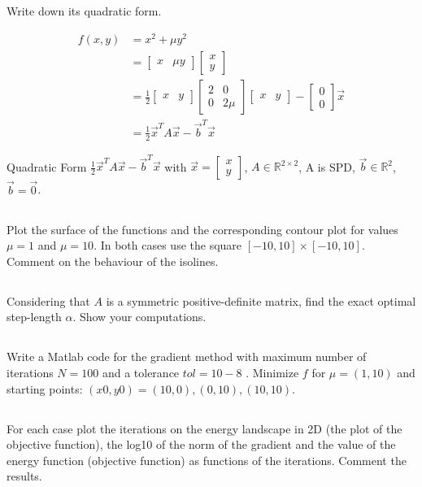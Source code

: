 \documentclass[unicode,11pt,a4paper,oneside,numbers=endperiod,openany]{scrartcl}
\newcommand{\myvec}[1]{\begin{bmatrix} #1 \end{bmatrix}}
\newcommand{\myex}[1]{\begin{equation*}\begin{aligned} #1 \end{aligned}\end{equation*}}
\begin{document}
\subsection{}
Write down its quadratic form. \newline

\myex{
    f(x, y) 
    & = x^2 + \mu y^2 \\
    & = \myvec{x & \mu y} \myvec{x \\ y} \\
    & = \frac{1}{2} \myvec{x & y} \myvec{2 & 0 \\ 0 & 2 \mu} \myvec{x & y} - \myvec{0 \\ 0} \vec{x} \\
    & = \frac{1}{2} \vec{x}^T A \vec{x} - \vec{b}^T \vec{x}
}

Quadratic Form $\frac{1}{2} \vec{x}^T A \vec{x} - \vec{b}^T \vec{x}$ 
with $\vec{x} = \myvec{x \\ y}$, $A \in \mathbb{R}^{2 \times 2}$, A is SPD, $\vec{b} \in \mathbb{R}^2$, $\vec{b} = \vec{0}$.

\subsection{}
Plot the surface of the functions and the corresponding contour plot for values $\mu = 1$ and $\mu = 10$. 
In both cases use the square $[-10, 10] \times [-10, 10]$.
Comment on the behaviour of the isolines.

\subsection{}
Considering that $A$ is a symmetric positive-definite matrix, find the exact optimal step-length $\alpha$.
Show your computations.

\subsection{}
Write a Matlab code for the gradient method with maximum number of iterations $N = 100$ and a tolerance $tol = 10-8$ . 
Minimize $f$ for $\mu = (1, 10)$ and starting points: $(x0 , y0 ) = (10, 0), (0, 10), (10, 10)$.

\subsection{}
For each case plot the iterations on the energy landscape in 2D (the plot of the objective function),
the log10 of the norm of the gradient and the value of the energy function (objective function) as functions of the iterations. 
Comment the results.
\end{document}
